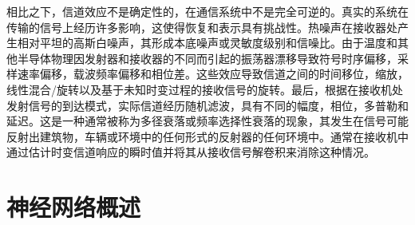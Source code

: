相比之下，信道效应不是确定性的，在通信系统中不是完全可逆的。真实的系统在传输的信号上经历许多影响，这使得恢复和表示具有挑战性。热噪声在接收器处产生相对平坦的高斯白噪声，其形成本底噪声或灵敏度级别和信噪比。由于温度和其他半导体物理因发射器和接收器的不同而引起的振荡器漂移导致符号时序偏移，采样速率偏移，载波频率偏移和相位差。这些效应导致信道之间的时间移位，缩放，线性混合/旋转以及基于未知时变过程的接收信号的旋转。最后，根据在接收机处发射信号的到达模式，实际信道经历随机滤波，具有不同的幅度，相位，多普勒和延迟。这是一种通常被称为多径衰落或频率选择性衰落的现象，其发生在信号可能反射出建筑物，车辆或环境中的任何形式的反射器的任何环境中。通常在接收机中通过估计时变信道响应的瞬时值并将其从接收信号解卷积来消除这种情况。\par

\section{神经网络概述}
